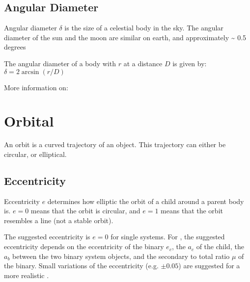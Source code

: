 \documentclass[letterpaper,10pt,english]{sphinxmanual}
\begin{document}
\subsection{Angular Diameter}
\label{\detokenize{quantities/surface/angular_diameter:angular-diameter}}\label{\detokenize{quantities/surface/angular_diameter::doc}}\label{\detokenize{quantities/surface/angular_diameter:id1}}
\sphinxAtStartPar
Angular diameter \(\delta\) is the size of a celestial body in the sky. The angular diameter of the sun and the moon are
similar on earth, and approximately \textasciitilde{} 0.5 degrees

\sphinxAtStartPar
The angular diameter of a body with {\hyperref[\detokenize{quantities/geometric/radius:id1}]{}} \(r\) at a distance \(D\)
is given by: \(\delta = 2 \arcsin(r/D)\)

\sphinxAtStartPar
More information on: 


\section{Orbital}
\label{\detokenize{quantities/orbital/orbital:orbital}}\label{\detokenize{quantities/orbital/orbital::doc}}\label{\detokenize{quantities/orbital/orbital:id1}}
\sphinxAtStartPar
An orbit is a curved trajectory of an object. This trajectory can either be circular, or elliptical.


\subsection{Eccentricity}
\label{\detokenize{quantities/orbital/eccentricity:eccentricity}}\label{\detokenize{quantities/orbital/eccentricity::doc}}\label{\detokenize{quantities/orbital/eccentricity:id1}}
\sphinxAtStartPar
Eccentricity \(e\) determines how elliptic the orbit of a child around a parent body is.
\(e = 0\) means that the orbit is circular, and \(e = 1\) means
that the orbit resembles a line (not a stable orbit).

\sphinxAtStartPar
The suggested eccentricity is \(e = 0\) for single {\hyperref[\detokenize{celestial_bodies/star:id1}]{}} systems.
For {\hyperref[\detokenize{celestial_systems/binary_system:id1}]{}}, the suggested eccentricity depends on the
eccentricity of the binary \(e_c\),
the {\hyperref[\detokenize{quantities/orbital/semi_major_axis:id1}]{}} \(a_c\) of the child, the
{\hyperref[\detokenize{quantities/orbital/semi_major_axis:id1}]{}} \(a_b\) between the two binary system objects,
and the secondary to total {\hyperref[\detokenize{quantities/material/mass:id1}]{}} ratio \(\mu\) of the binary. Small
variations of the eccentricity (e.g. \(\pm 0.05\)) are suggested for a more realistic
{\hyperref[\detokenize{quantities/orbital/orbital:id1}]{}}.
\end{document}
